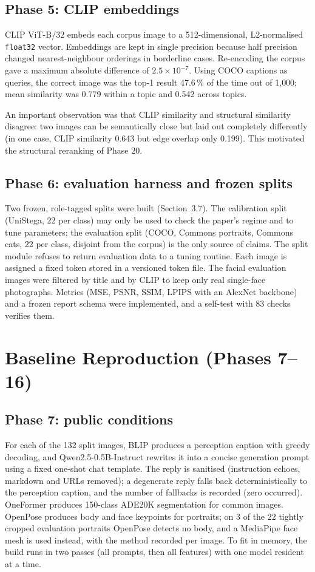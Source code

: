 \subsection{Phase 5: CLIP embeddings}
CLIP ViT-B/32 embeds each corpus image to a 512-dimensional, L2-normalised \texttt{float32}
vector. Embeddings are kept in single precision because half precision changed nearest-neighbour
orderings in borderline cases. Re-encoding the corpus gave a maximum absolute difference of
$2.5\times10^{-7}$. Using COCO captions as queries, the correct image was the top-1 result 47.6\,\%
of the time out of 1{,}000; mean similarity was 0.779 within a topic and 0.542 across topics.


An important observation was that CLIP similarity and structural similarity disagree: two
images can be semantically close but laid out completely differently (in one case, CLIP
similarity 0.643 but edge overlap only 0.199). This motivated the structural reranking of Phase 20.


\subsection{Phase 6: evaluation harness and frozen splits}
Two frozen, role-tagged splits were built (Section~3.7). The calibration split (UniStega, 22 per
class) may only be used to check the paper's regime and to tune parameters; the evaluation split
(COCO, Commons portraits, Commons cats, 22 per class, disjoint from the corpus) is the only
source of claims. The split module refuses to return evaluation data to a tuning routine.
Each image is assigned a fixed token stored in a versioned token file. The facial evaluation
images were filtered by title and by CLIP to keep only real single-face photographs. Metrics
(MSE, PSNR, SSIM, LPIPS with an AlexNet backbone) and a frozen report schema were implemented, and
a self-test with 83 checks verifies them.

\section{Baseline Reproduction (Phases 7--16)}
\subsection{Phase 7: public conditions}
For each of the 132 split images, BLIP produces a perception caption with greedy decoding, and
Qwen2.5-0.5B-Instruct rewrites it into a concise generation prompt using a fixed one-shot chat
template. The reply is sanitised (instruction echoes, markdown and URLs removed); a degenerate
reply falls back deterministically to the perception caption, and the number of fallbacks is
recorded (zero occurred). OneFormer produces 150-class ADE20K segmentation for common images.
OpenPose produces body and face keypoints for portraits; on 3 of the 22 tightly cropped
evaluation portraits OpenPose detects no body, and a MediaPipe face mesh is used instead, with
the method recorded per image. To fit in memory, the build runs in two passes (all prompts, then
all features) with one model resident at a time.

